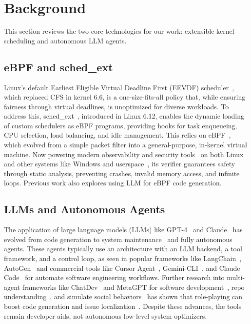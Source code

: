 \section{Background}
\label{sec:background}

This section reviews the two core technologies for our work: extensible kernel scheduling and autonomous LLM agents.

\subsection{eBPF and sched\_ext}

Linux's default Earliest Eligible Virtual Deadline First (EEVDF) scheduler~\cite{eevdf2024}, which replaced CFS in kernel 6.6, is a one-size-fits-all policy that, while ensuring fairness through virtual deadlines, is unoptimized for diverse workloads. To address this, sched\_ext~\cite{schedext2024}, introduced in Linux 6.12, enables the dynamic loading of custom schedulers as eBPF programs, providing hooks for task enqueueing, CPU selection, load balancing, and idle management. This relies on eBPF~\cite{ebpfio}, which evolved from a simple packet filter into a general-purpose, in-kernel virtual machine. Now powering modern observability and security tools~\cite{tracee,cilium} on both Linux and other systems like Windows and userspace~\cite{zheng2025extending, windows-ebpf}, its verifier guarantees safety through static analysis, preventing crashes, invalid memory access, and infinite loops. Previous work also explores using LLM for eBPF code generation\cite{kgent}.

\subsection{LLMs and Autonomous Agents}

The application of large language models (LLMs) like GPT-4~\cite{openai2023gpt4} and Claude~\cite{anthropic2024claude} has evolved from code generation to system maintenance~\cite{de2025llm} and fully autonomous agents. These agents typically use an architecture with an LLM backend, a tool framework, and a control loop, as seen in popular frameworks like LangChain~\cite{langchain}, AutoGen~\cite{autogen} and commercial tools like Cursor Agent~\cite{cursor}, Gemini-CLI~\cite{geminicli}, and Claude Code~\cite{claudecode} for automate software engineering workflows. Further research into multi-agent frameworks like ChatDev~\cite{qian2024chatdev} and MetaGPT for software development~\cite{hong2023metagpt}, repo understanding~\cite{coderesearcher2025}, and simulate social behaviors~\cite{agent4se2024} has shown that role-playing can boost code generation and issue localization~\cite{Lin2025FlowGen,Batole2025LocalizeAgent}. Despite these advances, the tools remain developer aids, not autonomous low-level system optimizers.